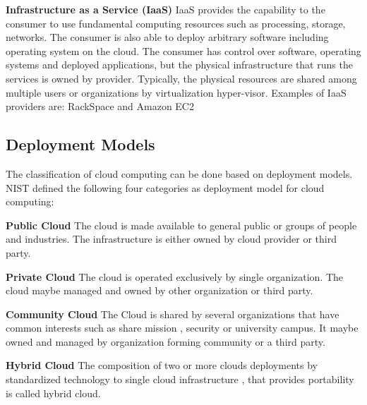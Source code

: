 \textbf{Infrastructure as a Service (IaaS)} IaaS provides the capability to the consumer to use fundamental computing resources such as processing, storage, networks. The consumer is also able to deploy arbitrary software including operating system on the cloud. The consumer has control over software, operating systems and deployed applications, but the physical infrastructure that runs the services is owned by provider. Typically, the physical resources are shared among multiple users or organizations by virtualization hyper-visor. Examples of IaaS‌ providers are: RackSpace and Amazon EC2\\ 


\subsection{Deployment Models}

The classification of cloud computing can be done based on deployment models. NIST \cite{nist} defined the following four categories as deployment model for cloud computing:

\textbf{Public Cloud} 
The cloud is made available to general public or groups of people and industries. The infrastructure is either owned by cloud provider or third party. 
  
\textbf{Private Cloud} 
The cloud is operated exclusively by single organization. The cloud maybe managed and owned by other organization or third party. 
 
\textbf{Community Cloud} 
The Cloud is shared by several organizations that have common interests such as share mission , security or university campus. It maybe owned and managed by organization forming community or a third party. 


\textbf{Hybrid Cloud} 
The composition of two or more clouds deployments by standardized technology to single cloud infrastructure , that provides portability is called hybrid cloud. \

















